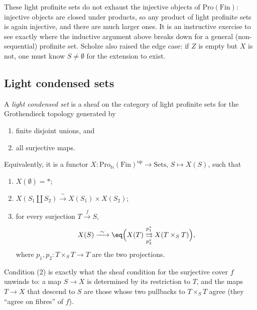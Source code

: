 \begin{remark}
\label{rmk:2:injective-more}
These light profinite sets do not exhaust the injective objects of
$\mathrm{Pro}(\mathrm{Fin})$: injective objects are closed under products, so any
product of light profinite sets is again injective, and there are much larger
ones. It is an instructive exercise to see exactly where the inductive argument
above breaks down for a general (non-sequential) profinite set. Scholze also
raised the edge case: if $Z$ is empty but $X$ is not, one must know $S\neq
\emptyset$ for the extension to exist.
\end{remark}

\subsection{Light condensed sets}

\begin{definition}
\label{def:2:light-condensed-set}
A \emph{light condensed set} is a sheaf on the category of light profinite sets
for the Grothendieck topology generated by
\begin{enumerate}
\item finite disjoint unions, and
\item all surjective maps.
\end{enumerate}
Equivalently, it is a functor
$X\colon\mathrm{Pro}_{\mathbb{N}}(\mathrm{Fin})^{\mathrm{op}}\to\mathrm{Sets}$,
$S\mapsto X(S)$, such that
\begin{enumerate}
\item[(0)] $X(\emptyset)=\ast$;
\item[(1)] $X(S_1\amalg S_2)\xrightarrow{\ \sim\ }X(S_1)\times X(S_2)$;
\item[(2)] for every surjection $T\xrightarrow{f}S$,
\begin{equation*}
X(S)\xrightarrow{\ \sim\ }\eq\Bigl(X(T)
\underset{p_2^{*}}{\overset{p_1^{*}}{\rightrightarrows}}
X(T\times_S T)\Bigr),
\end{equation*}
where $p_1,p_2\colon T\times_S T\to T$ are the two projections.
\end{enumerate}
\end{definition}

Condition (2) is exactly what the sheaf condition for the surjective cover $f$
unwinds to: a map $S\to X$ is determined by its restriction to $T$, and the maps
$T\to X$ that descend to $S$ are those whose two pullbacks to $T\times_S T$ agree
(they ``agree on fibres'' of $f$).

